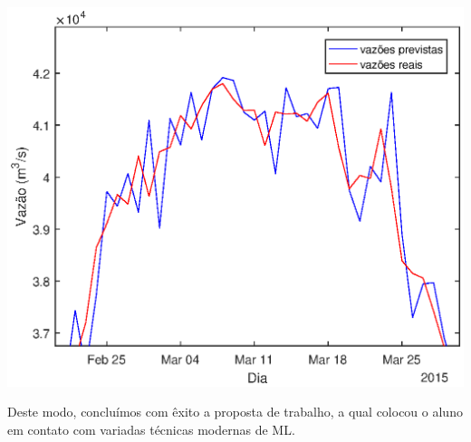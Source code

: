 \documentclass[a4paper]{article}
\newenvironment{Figure}
  {\vspace{0pt}\noindent\minipage{\linewidth}}
  {\endminipage\vspace{5pt}}
\begin{document}
\begin{multicols}{2}
\begin{Figure}
 \centering
 \includegraphics[width=\linewidth]{vazoes_Jirau_AR_zoom.eps}
\label{fig:previsao_AR}
\end{Figure}

    Deste modo, concluímos com êxito a proposta de trabalho, a qual colocou o aluno em contato com variadas técnicas modernas de ML.


\small{
}



%


\end{multicols}
\end{document}

